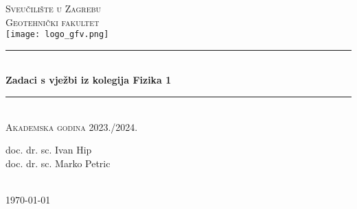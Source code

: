 \documentclass[10pt]{book}
\begin{document}
\begin{titlepage}

\newcommand{\HRule}{\rule{\linewidth}{0.5mm}} %

\center %

\textsc{\Large Sveučilište u Zagrebu\\ Geotehnički fakultet}\\[1.0cm] %

\texttt{[image: logo\_gfv.png]}\\[2.0cm] %


\HRule \\[0.4cm]
{ \huge \bfseries Zadaci s vježbi iz kolegija Fizika 1}\\[0.4cm] %
\HRule \\[1.5cm]

\textsc{\large Akademska godina 2023./2024.}\\[0.5cm] %

\justify
 
\begin{center}
\begin{minipage}{0.8\textwidth}
\begin{justify} 
\vspace{1.2cm}
\begin{center}
doc. dr. sc. Ivan Hip\\
doc. dr. sc. Marko Petric\\
                     
\end{center}

\end{justify}
\end{minipage}\\[3cm]
\today
\end{center}


\end{titlepage}
\end{document}
